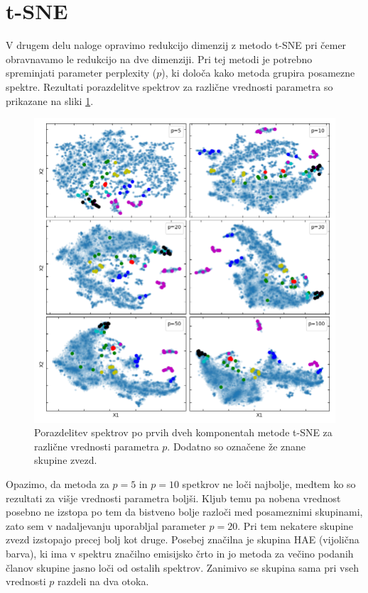 \documentclass[11pt,a4paper]{article}
\begin{document}
\clearpage

\section{t-SNE}

V drugem delu naloge opravimo redukcijo dimenzij z metodo t-SNE pri čemer obravnavamo le redukcijo na dve dimenziji. Pri tej metodi je potrebno spreminjati parameter perplexity ($p$), ki določa kako metoda grupira posamezne spektre. Rezultati porazdelitve spektrov za različne vrednosti parametra so prikazane na sliki \ref{8}.

\begin{figure}[h]
    \centering
    \hbox{\hspace{2em}\includegraphics[scale=0.7]{tSNE_klasifikacija}}
    \caption{Porazdelitev spektrov po prvih dveh komponentah metode t-SNE za različne vrednosti parametra $p$. Dodatno so označene že znane skupine zvezd.}
    \label{8}
\end{figure}

Opazimo, da metoda za $p=5$ in $p=10$ spetkrov ne loči najbolje, medtem ko so rezultati za višje vrednosti parametra boljši. Kljub temu pa nobena vrednost posebno ne izstopa po tem da bistveno bolje razloči med posameznimi skupinami, zato sem v nadaljevanju uporabljal parameter $p=20$. Pri tem nekatere skupine zvezd izstopajo precej bolj kot druge. Posebej značilna je skupina HAE (vijolična barva), ki ima v spektru značilno emisijsko črto in 
jo metoda za večino podanih članov skupine jasno loči od ostalih spektrov. Zanimivo se skupina sama pri vseh vrednosti $p$ razdeli na dva otoka.
\end{document}
